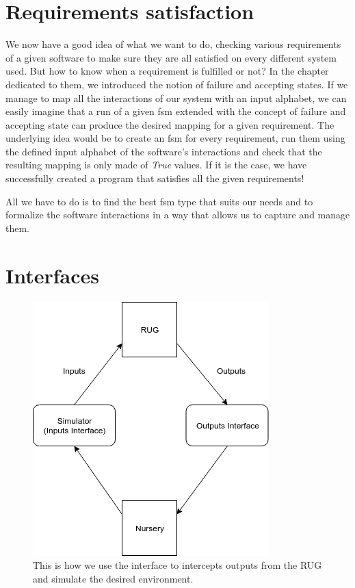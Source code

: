 \documentclass[12pt]{article}
\theoremstyle{definition}
\theoremstyle{definition}
\theoremstyle{remark}
\begin{document}

\section{Requirements satisfaction}


We now have a good idea of what we want to do, checking various requirements of a given software to make sure they are all satisfied on every different system used. But how to know when a requirement is fulfilled or not? In the chapter dedicated to them, we introduced the notion of failure and accepting states. If we manage to map all the interactions of our system with an input alphabet, we can easily imagine that a run of a given \gls{fsm} extended with the concept of failure and accepting state can produce the desired mapping for a given requirement. The underlying idea would be to create an \gls{fsm} for every requirement, run them using the defined input alphabet of the software's interactions and check that the resulting mapping is only made of \textit{True} values. If it is the case, we have successfully created a program that satisfies all the given requirements!

All we have to do is to find the best \gls{fsm} type that suits our needs and to formalize the software interactions in a way that allows us to capture and manage them.



\section{Interfaces}


\begin{figure}
    \centering
    \includegraphics[scale=0.8]{rug_io_simulation.png}
    \caption{This is how we use the interface to intercepts outputs from the RUG and simulate the desired environment.}
    \label{rug_io_simulation}
\end{figure}
\end{document}
